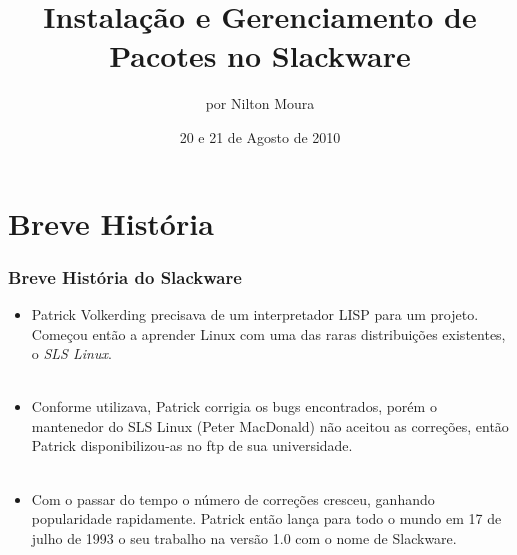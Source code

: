 \documentclass[aspectratio=169]{beamer}
\date{20 e 21 de Agosto de 2010}
\begin{document}
\title{Instalação e Gerenciamento de Pacotes no Slackware}

\author[Nilton Moura]{por Nilton Moura}


\begin{frame}
	\titlepage
\end{frame}

\section{Breve História}
\begin{frame}
	\frametitle{Breve História do Slackware}
	\begin{itemize}
		\item Patrick Volkerding precisava de um interpretador LISP para um
			projeto. Começou então a aprender Linux com uma das raras
			distribuições existentes, o \textit{SLS Linux}.
		~\\
		~\\
		\item Conforme utilizava, Patrick corrigia os bugs encontrados, porém
			o mantenedor do SLS Linux (Peter MacDonald) não aceitou as
			correções, então Patrick disponibilizou-as no ftp de sua
			universidade.
		~\\
		~\\
		\item Com o passar do tempo o número de correções cresceu, ganhando
			popularidade rapidamente. Patrick então lança para todo o mundo
			em 17 de julho de 1993 o seu trabalho na versão 1.0 com o nome de
			Slackware.
	\end{itemize}
\end{frame}
\end{document}
